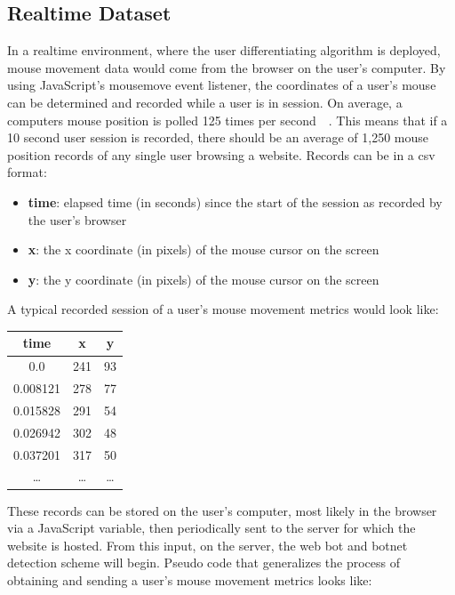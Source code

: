\subsection{Realtime Dataset}\label{subsec:realtime-dataset}
In a realtime environment, where the user differentiating algorithm is deployed, mouse movement data would come from the browser on the user's computer.
By using JavaScript's mousemove event listener, the coordinates of a user's mouse can be determined and recorded while a user is in session.
On average, a computers mouse position is polled 125 times per second~\cite{mouse_dpi_and_polling_rate_explained}~\cite{mouse_dpi_and_usb_polling_rate}.
This means that if a 10 second user session is recorded, there should be an average of 1,250 mouse position records of any single user browsing a website.
Records can be in a csv format:
\begin{itemize}
    \item \textbf{time}: elapsed time (in seconds) since the start of the session as recorded by the user's browser
    \item \textbf{x}: the x coordinate (in pixels) of the mouse cursor on the screen
    \item \textbf{y}: the y coordinate (in pixels) of the mouse cursor on the screen
\end{itemize}
A typical recorded session of a user's mouse movement metrics would look like:
\begin{center}
    \begin{tabular}{ |c|c|c| }
        \hline
        \textbf{time} & \textbf{x} & \textbf{y} \\
        \hline
        0.0 & 241 & 93 \\
        0.008121 & 278 & 77 \\
        0.015828 & 291 & 54 \\
        0.026942 & 302 & 48 \\
        0.037201 & 317 & 50 \\
        \ldots & \ldots & \ldots \\
        \hline
    \end{tabular}
\end{center}
These records can be stored on the user's computer, most likely in the browser via a JavaScript variable, then periodically sent to the server for which the website is hosted.
From this input, on the server, the web bot and botnet detection scheme will begin.
Pseudo code that generalizes the process of obtaining and sending a user's mouse movement metrics looks like:

